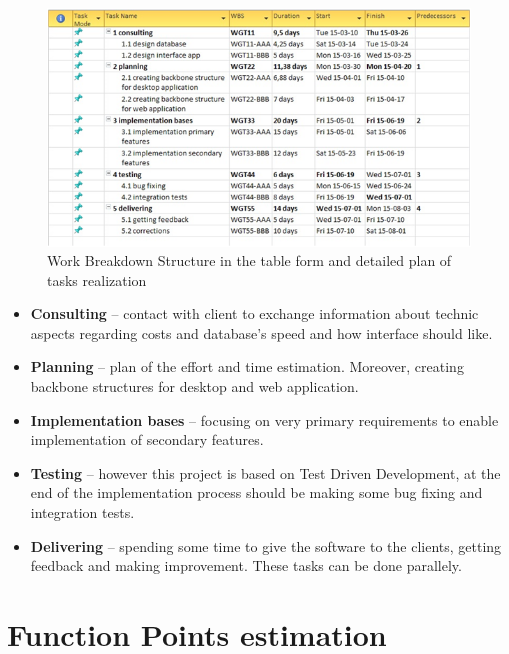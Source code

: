\documentclass[a4paper,10pt]{report}
\begin{document}
 \begin{figure}[H]
    \centering
            \includegraphics[width=1\textwidth]{img/WBS.png}
                \caption{Work Breakdown Structure in the table form and detailed plan of tasks realization}
\label{fig:rys1}
\end{figure} 

\begin{itemize}
  \item \textbf{Consulting} – contact with client to exchange information about technic aspects regarding costs and database’s speed and how interface should like.

  \item \textbf{Planning} – plan of the effort and time estimation. Moreover, creating backbone structures for desktop and web application. 

  \item \textbf{Implementation bases} – focusing on very primary requirements to enable implementation of secondary features. 

  \item \textbf{Testing} – however this project is based on Test Driven Development, at the end of the implementation process should be making some bug fixing and integration tests.

  \item \textbf{Delivering} – spending some time to give the software to the clients, getting feedback and making improvement. These tasks can be done parallely. 
\end{itemize}

\section{Function Points estimation}
\end{document}
